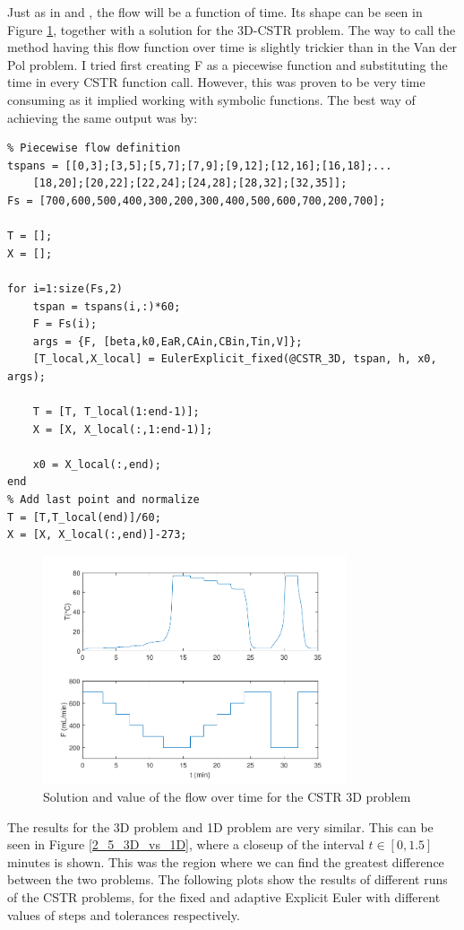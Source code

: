 Just as in \cite{Bagterp1} and \cite{Bagterp2}, the flow will be a function of time. Its shape can be seen in Figure \ref{2_5_3D_trial}, together with a solution for the 3D-CSTR problem. The way to call the method having this flow function over time is slightly trickier than in the Van der Pol problem. I tried first creating F as a piecewise function and substituting the time in every CSTR function call. However, this was proven to be very time consuming as it implied working with symbolic functions. The best way of achieving the same output was by:
\pagebreak
\begin{lstlisting}
% Piecewise flow definition
tspans = [[0,3];[3,5];[5,7];[7,9];[9,12];[12,16];[16,18];...
    [18,20];[20,22];[22,24];[24,28];[28,32];[32,35]];
Fs = [700,600,500,400,300,200,300,400,500,600,700,200,700];

T = [];
X = [];

for i=1:size(Fs,2)
    tspan = tspans(i,:)*60;
    F = Fs(i);
    args = {F, [beta,k0,EaR,CAin,CBin,Tin,V]};
    [T_local,X_local] = EulerExplicit_fixed(@CSTR_3D, tspan, h, x0, args);
    
    T = [T, T_local(1:end-1)];
    X = [X, X_local(:,1:end-1)];
    
    x0 = X_local(:,end);
end
% Add last point and normalize
T = [T,T_local(end)]/60;
X = [X, X_local(:,end)]-273;
\end{lstlisting}

\begin{figure}[H]
    \centering
    \includegraphics[width=0.8\textwidth]{images/2/2_5_3D_trial.pdf}
    \caption{Solution and value of the flow over time for the CSTR 3D problem}
    \label{2_5_3D_trial}
\end{figure}

The results for the 3D problem and 1D problem are very similar. This can be seen in Figure \ref{2_5_3D_vs_1D}, where a closeup of the interval $t \in [0,1.5]$ minutes is shown. This was the region where we can find the greatest difference between the two problems. The following plots show the results of different runs of the CSTR problems, for the fixed and adaptive Explicit Euler with different values of steps and tolerances respectively.

